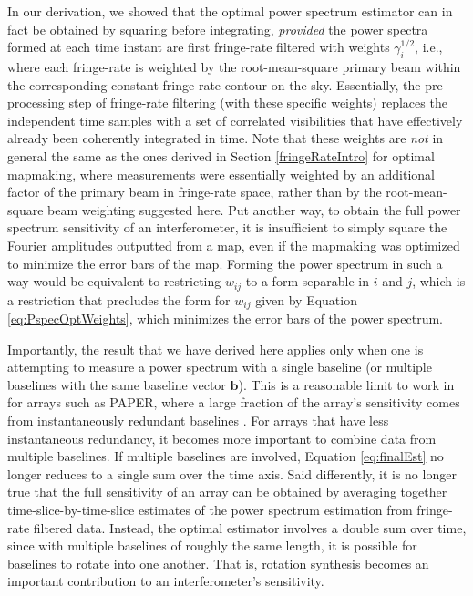 \documentclass[twocolumn,apj,numberedappendix]{emulateapj}
\begin{document}
In our derivation, we showed that the optimal power spectrum estimator can in fact be obtained by squaring before integrating, \emph{provided} the power spectra formed at each time instant are first fringe-rate filtered with weights $ \gamma_i^{1/2}$, i.e., where each fringe-rate is weighted by the root-mean-square primary beam within the corresponding constant-fringe-rate contour on the sky. Essentially, the pre-processing step of fringe-rate filtering (with these specific weights) replaces the independent time samples with a set of correlated visibilities that have effectively already been coherently integrated in time. Note that these weights are \emph{not} in general the same as the ones derived in Section \ref{fringeRateIntro} for optimal mapmaking, where measurements were essentially weighted by an additional factor of the primary beam in fringe-rate space, rather than by the root-mean-square beam weighting suggested here. Put another way, to obtain the full power spectrum sensitivity of an interferometer, it is insufficient
to simply square the Fourier amplitudes outputted from a map, even if the mapmaking was optimized to minimize the error bars of the map.  Forming the power spectrum in such a way would be equivalent to restricting $w_{ij}$ to a form separable in $i$ and $j$, which is a restriction that precludes the form for $w_{ij}$ given by Equation \ref{eq:PspecOptWeights}, which minimizes the error bars of the power spectrum.

Importantly, the result that we have derived here applies only when one is attempting to measure a power spectrum with a single baseline (or multiple baselines with the same baseline vector $\mathbf{b}$). This is a reasonable limit to work in for arrays such as PAPER, where a large fraction of the array's sensitivity comes from instantaneously redundant baselines \citep{parsons_et_al2012a}. For arrays that have less instantaneous redundancy, it becomes more important to combine data from multiple baselines. If multiple baselines are involved, Equation \eqref{eq:finalEst} no longer reduces to a single sum over the time axis. Said differently, it is no longer true that the full sensitivity of an array can be obtained by averaging together time-slice-by-time-slice estimates of the power spectrum estimation from fringe-rate filtered data. Instead, the optimal estimator involves a double sum over time, since with multiple baselines of roughly the same length, it is possible for baselines to rotate into one another. That is, rotation synthesis becomes an important contribution to an interferometer's sensitivity.
\end{document}
